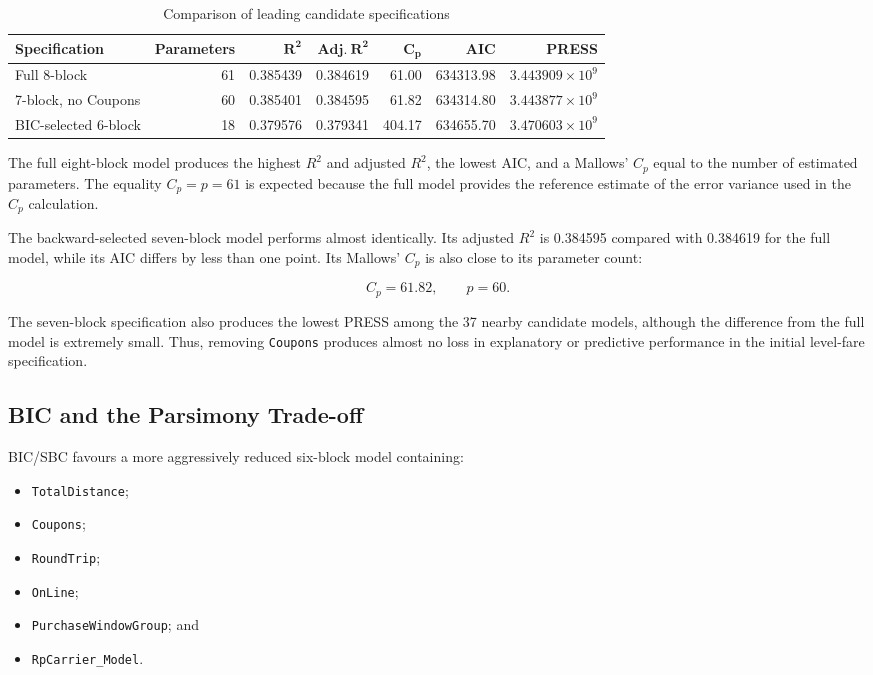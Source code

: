 \documentclass[11pt,a4paper]{article}
\begin{document}
\begin{table}[H]
\centering
\caption{Comparison of leading candidate specifications}
\label{tab:model-selection-comparison}
\small
\begin{tabular}{lrrrrrr}
\toprule
\textbf{Specification} & \textbf{Parameters} & \(\mathbf{R^2}\) & \(\mathbf{Adj.\ R^2}\) & \(\mathbf{C_p}\) & \textbf{AIC} & \textbf{PRESS} \\
\midrule
Full 8-block & 61 & 0.385439 & 0.384619 & 61.00 & 634313.98 & \(3.443909\times10^9\) \\
7-block, no Coupons & 60 & 0.385401 & 0.384595 & 61.82 & 634314.80 & \(3.443877\times10^9\) \\
BIC-selected 6-block & 18 & 0.379576 & 0.379341 & 404.17 & 634655.70 & \(3.470603\times10^9\) \\
\bottomrule
\end{tabular}
\end{table}

The full eight-block model produces the highest \(R^2\) and adjusted \(R^2\), the lowest AIC, and a Mallows' \(C_p\) equal to the number of estimated parameters. The equality \(C_p=p=61\) is expected because the full model provides the reference estimate of the error variance used in the \(C_p\) calculation.

The backward-selected seven-block model performs almost identically. Its adjusted \(R^2\) is 0.384595 compared with 0.384619 for the full model, while its AIC differs by less than one point. Its Mallows' \(C_p\) is also close to its parameter count:

\[
C_p = 61.82,
\qquad
p = 60.
\]

The seven-block specification also produces the lowest PRESS among the 37 nearby candidate models, although the difference from the full model is extremely small. Thus, removing \texttt{Coupons} produces almost no loss in explanatory or predictive performance in the initial level-fare specification.

\subsection{BIC and the Parsimony Trade-off}

BIC/SBC favours a more aggressively reduced six-block model containing:

\begin{itemize}
    \item \texttt{TotalDistance};
    \item \texttt{Coupons};
    \item \texttt{RoundTrip};
    \item \texttt{OnLine};
    \item \texttt{PurchaseWindowGroup}; and
    \item \texttt{RpCarrier\_Model}.
\end{itemize}
\end{document}
